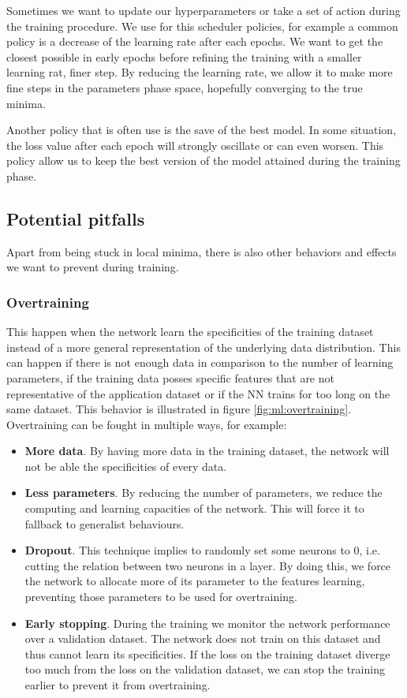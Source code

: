 \documentclass[../main.tex]{subfiles}
\begin{document}
Sometimes we want to update our hyperparameters or take a set of action during the training procedure. We use for this scheduler policies, for example a common policy is a decrease of the learning rate after each epochs. We want to get the closest possible in early epochs before refining the training with a smaller learning rat, finer step. By reducing the learning rate, we allow it to make more fine steps in the parameters phase space, hopefully converging to the true minima.

Another policy that is often use is the save of the best model. In some situation, the loss value after each epoch will strongly oscillate or can even worsen. This policy allow us to keep the best version of the model attained during the training phase.

\subsection{Potential pitfalls}
\label{sec:ml:pitfall}

Apart from being stuck in local minima, there is also other behaviors and effects we want to prevent during training.

\subsubsection{Overtraining}
This happen when the network learn the specificities of the training dataset instead of a more general representation of the underlying data distribution. This can happen if there is not enough data in comparison to the number of learning parameters, if the training data posses specific features that are not representative of the application dataset or if the NN trains for too long on the same dataset. This behavior is illustrated in figure \ref{fig:ml:overtraining}. Overtraining can be fought in multiple ways, for example:
\begin{itemize}
  \item \textbf{More data}. By having more data in the training dataset, the network will not be able the specificities of every data.
  \item \textbf{Less parameters}. By reducing the number of parameters, we reduce the computing and learning capacities of the network. This will force it to fallback to generalist behaviours.
  \item \textbf{Dropout}. This technique implies to randomly set some neurons to 0, i.e. cutting the relation between two neurons in a layer. By doing this, we force the network to allocate more of its parameter to the features learning, preventing those parameters to be used for overtraining.
  \item \textbf{Early stopping}. During the training we monitor the network performance over a validation dataset. The network does not train on this dataset and thus cannot learn its specificities. If the loss on the training dataset diverge too much from the loss on the validation dataset, we can stop the training earlier to prevent it from overtraining.
\end{itemize}
\end{document}

